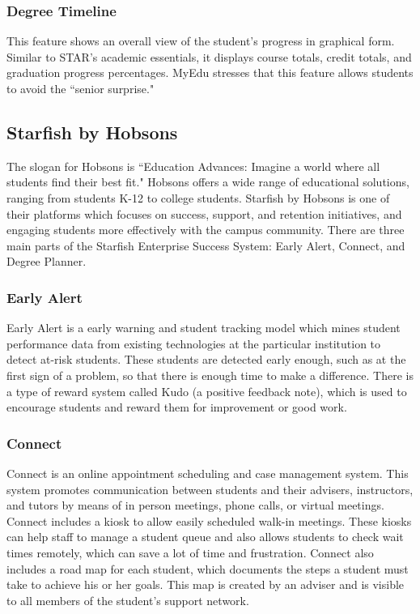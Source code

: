 \subsubsection{Degree Timeline}
This feature shows an overall view of the student's progress in graphical form. Similar to STAR's academic essentials, it displays course totals, credit totals, and graduation progress percentages. MyEdu stresses that this feature allows students to avoid the ``senior surprise."

\subsection{Starfish by Hobsons}
The slogan for Hobsons is ``Education Advances: Imagine a world where all students find their best fit." Hobsons offers a wide range of educational solutions, ranging from students K-12 to college students. Starfish by Hobsons is one of their platforms which focuses on success, support, and retention initiatives, and engaging students more effectively with the campus community. There are three main parts of the Starfish Enterprise Success System: Early Alert, Connect, and Degree Planner.
\subsubsection{Early Alert}
Early Alert is a early warning and student tracking model which mines student performance data from existing technologies at the particular institution to detect at-risk students. These students are detected early enough, such as at the first sign of a problem, so that there is enough time to make a difference. There is a type of reward system called Kudo (a positive feedback note), which is used to encourage students and reward them for improvement or good work. 
\subsubsection{Connect}
Connect is an online appointment scheduling and case management system. This system promotes communication between students and their advisers, instructors, and tutors by means of in person meetings, phone calls, or virtual meetings. Connect includes a kiosk to allow easily scheduled walk-in meetings. These kiosks can help staff to manage a student queue and also allows students to check wait times remotely, which can save a lot of time and frustration. Connect also includes a road map for each student, which documents the steps a student must take to achieve his or her goals. This map is created by an adviser and is visible to all members of the student's support network. 
